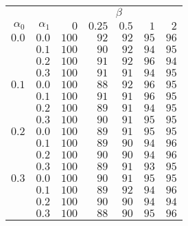 \begin{tabular}{rr|rrrrr}
\hline\hline
 && \multicolumn{5}{c}{$\beta$}\\
 $\alpha_0$ & $\alpha_1$ & $0$ & $0.25$ & $0.5$ & $1$ & $2$ \\ 
 \hline
$0.0$ & $0.0$ & $100$ & $92$ & $92$ & $95$ & $96$\\ 
 & $0.1$ & $100$ & $90$ & $92$ & $94$ & $95$\\ 
 & $0.2$ & $100$ & $91$ & $92$ & $96$ & $94$\\ 
 & $0.3$ & $100$ & $91$ & $91$ & $94$ & $95$\\ 
\hline 
 $0.1$ & $0.0$ & $100$ & $88$ & $92$ & $96$ & $95$\\ 
 & $0.1$ & $100$ & $91$ & $91$ & $96$ & $95$\\ 
 & $0.2$ & $100$ & $89$ & $91$ & $94$ & $95$\\ 
 & $0.3$ & $100$ & $90$ & $91$ & $95$ & $95$\\ 
\hline 
 $0.2$ & $0.0$ & $100$ & $89$ & $91$ & $95$ & $95$\\ 
 & $0.1$ & $100$ & $89$ & $90$ & $94$ & $96$\\ 
 & $0.2$ & $100$ & $90$ & $90$ & $94$ & $96$\\ 
 & $0.3$ & $100$ & $89$ & $91$ & $93$ & $95$\\ 
\hline 
 $0.3$ & $0.0$ & $100$ & $90$ & $91$ & $95$ & $95$\\ 
 & $0.1$ & $100$ & $89$ & $92$ & $94$ & $96$\\ 
 & $0.2$ & $100$ & $90$ & $90$ & $94$ & $94$\\ 
 & $0.3$ & $100$ & $88$ & $90$ & $95$ & $96$\\ 
 \hline 
 \end{tabular}